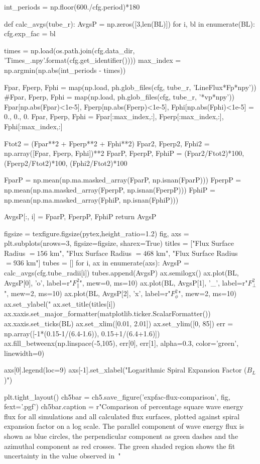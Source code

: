 \begin{pycode}[chapter5]
int_periods = np.floor(600./cfg.period)*180

def calc_avgs(tube_r):
    AvgsP = np.zeros([3,len(BL)])
    for i, bl in enumerate(BL):
        cfg.exp_fac = bl

        times = np.load(os.path.join(cfg.data_dir, 'Times_{}.npy'.format(cfg.get_identifier())))
        max_index = np.argmin(np.abs(int_periods - times))

        Fpar, Fperp, Fphi = map(np.load, ph.glob_files(cfg, tube_r, 'LineFlux*Fp*npy'))
        #Fpar, Fperp, Fphi = map(np.load, ph.glob_files(cfg, tube_r, '*vp*npy'))
        Fpar[np.abs(Fpar)<1e-5], Fperp[np.abs(Fperp)<1e-5], Fphi[np.abs(Fphi)<1e-5] = 0., 0., 0.
        Fpar, Fperp, Fphi = Fpar[:max_index,:], Fperp[:max_index,:], Fphi[:max_index,:]

        Ftot2 = (Fpar**2 + Fperp**2 + Fphi**2)
        Fpar2, Fperp2, Fphi2 = np.array([Fpar, Fperp, Fphi])**2
        FparP, FperpP, FphiP = (Fpar2/Ftot2)*100, (Fperp2/Ftot2)*100, (Fphi2/Ftot2)*100

        FparP = np.mean(np.ma.masked_array(FparP, np.isnan(FparP)))
        FperpP = np.mean(np.ma.masked_array(FperpP, np.isnan(FperpP)))
        FphiP = np.mean(np.ma.masked_array(FphiP, np.isnan(FphiP)))

        AvgsP[:, i] = FparP, FperpP, FphiP
    return AvgsP

figsize = texfigure.figsize(pytex,height_ratio=1.2)
fig, axs = plt.subplots(nrows=3, figsize=figsize, sharex=True)
titles = ["Flux Surface Radius $=156$ km", "Flux Surface Radius $=468$ km", "Flux Surface Radius $=936$ km"]
tubes = []
for i, ax in enumerate(axs):
    AvgsP = calc_avgs(cfg.tube_radii[i])
    tubes.append(AvgsP)
    ax.semilogx()
    ax.plot(BL, AvgsP[0], 'o', label=r"$F_\parallel^2$", mew=0, ms=10)
    ax.plot(BL, AvgsP[1], '_', label=r"$F_\perp^2$", mew=2, ms=10)
    ax.plot(BL, AvgsP[2], 'x', label=r"$F_\phi^2$", mew=2, ms=10)
    ax.set_ylabel("%
    ax.set_title(titles[i])
    ax.xaxis.set_major_formatter(matplotlib.ticker.ScalarFormatter())
    ax.xaxis.set_ticks(BL)
    ax.set_xlim([0.01, 2.01])
    ax.set_ylim([0, 85])
    err = np.array([-1*(0.15-1/(6.4-1.6)), 0.15+1/(6.4+1.6)])
    ax.fill_betweenx(np.linspace(-5,105), err[0], err[1], alpha=0.3, color='green', linewidth=0)

axs[0].legend(loc=9)
axs[-1].set_xlabel("Logarithmic Spiral Expansion Factor ($B_L$)")

plt.tight_layout()
ch5bar = ch5.save_figure('expfac-flux-comparison', fig, fext='.pgf')
ch5bar.caption = r"Comparison of percentage square wave energy flux for all simulations and all calculated flux surfaces, plotted against spiral expansion factor on a log scale. The parallel component of wave energy flux is shown as blue circles, the perpendicular component as green dashes and the azimuthal component as red crosses. The green shaded region shows the fit uncertainty in the value observed in~\citet{bonet2008}"
\end{pycode}

